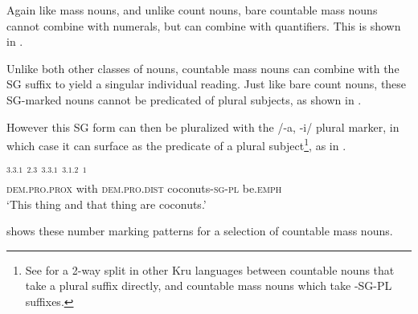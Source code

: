 \documentclass[output=paper,colorlinks,citecolor=brown]{langscibook}
\begin{document}
Again like mass nouns, and unlike count nouns, bare countable mass nouns cannot combine with numerals, but can combine with quantifiers. This is shown in .

\ea%
    \label{ex:sande:8}
    \z
\z

Unlike both other classes of nouns, countable mass nouns can combine with the SG suffix to yield a singular individual reading. Just like bare count nouns, these SG-marked nouns cannot be predicated of plural subjects, as shown in .

\z

However this SG form can then be pluralized with the /-a, -i/ plural marker, in which case it can surface as the predicate of a plural subject\footnote{See \cite[88--89]{Marchese1979} for a 2-way split in other Kru languages between countable nouns that take a plural suffix directly, and countable mass nouns which take -SG-PL suffixes.}, as in .

\ea%
    \label{ex:sande:10}
    \gll    {}$^{3.3.1}$ $^{2.3}$ $^{3.3.1}$ $^{3.1.2}$ $^{1}$\\
	        \textsc{dem.pro.prox} with \textsc{dem.pro.dist} coconuts\textsc{-sg-pl} be.\textsc{emph}\\
	\glt    `This thing and that thing are coconuts.'
\z

 shows these number marking patterns for a selection of countable mass nouns.
\end{document}
